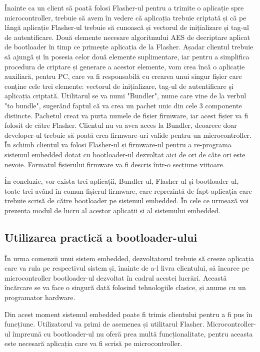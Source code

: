 \documentclass[12pt,a4paper,titlepage]{report}
\begin{document}
Înainte ca un client să poată folosi Flasher-ul pentru a trimite o aplicație spre microcontroller, trebuie să avem în vedere că aplicația trebuie criptată și că pe lângă aplicație Flasher-ul trebuie să cunoască și vectorul de inițializare și tag-ul de autentificare. Două elemente necesare algoritmului AES de decriptare aplicat de bootloader în timp ce primește aplicația de la Flasher. Așadar clientul trebuie să ajungă și în posesia celor două elemente suplimentare, iar pentru a simplifica procedura de criptare și generare a acestor elemente, vom crea încă o aplicație auxiliară, pentru PC, care va fi responsabilă cu crearea unui singur fișier care conține cele trei elemente: vectorul de inițializare, tag-ul de autentificare și aplicația criptată.
Utilitarul se va numi "Bundler", nume care vine de la verbul "to bundle", sugerând faptul că va crea un pachet unic din cele 3 componente distincte. Pachetul creat va purta numele de fișier firmware, iar acest fișier va fi folosit de către Flasher. Clientul nu va avea acces la Bundler, deoarece doar developer-ul trebuie să poată crea firmware-uri valide pentru un microcontroller. În schimb clientul va folosi Flasher-ul și firmware-ul pentru a re-programa sistemul embedded dotat cu bootloader-ul dezvoltat aici de ori de câte ori este nevoie. Formatul fișierului firmware va fi descris într-o secțiune viitoare.

În concluzie, vor exista trei aplicații, Bundler-ul, Flasher-ul și bootloader-ul, toate trei având în comun fișierul firmware, care reprezintă de fapt aplicația care trebuie scrisă de către bootloader pe sistemul embedded. În cele ce urmează voi prezenta modul de lucru al acestor aplicații și al sistemului embedded.

\subsection{Utilizarea practică a bootloader-ului}

În urma comenzii unui sistem embedded, dezvoltatorul trebuie să creeze aplicația care va rula pe respectivul sistem și, înainte de a-l livra clientului, să încarce pe microcontroller bootloader-ul dezvoltat în cadrul acestei lucrări. Această încărcare se va face o singură dată folosind tehnologiile clasice, și anume cu un programator hardware.

Din acest moment sistemul embedded poate fi trimis clientului pentru a fi pus în funcțiune. Utilizatorul va primi de asemenea și utilitarul Flasher. Microcontroller-ul împreună cu bootloader-ul nu oferă prea multă funcționalitate, pentru aceasta este necesară aplicația care va fi scrisă pe microcontroller.
\end{document}
